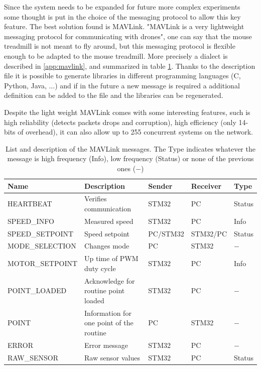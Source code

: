 \documentclass[12pt,a4paper]{article}
\begin{document}
Since the system needs to be expanded for future more complex experiments some thought is put in the choice of the messaging protocol to allow this key feature.
The best solution found is MAVLink. "MAVLink is a very lightweight messaging protocol for communicating with drones"\cite{mavlink}, one can say that the mouse treadmill is not meant to fly around, but this messaging protocol is flexible enough to be adapted to the mouse treadmill.
More precisely a dialect is described in \ref{app:mavlink}, and summarized in table \ref{tab:msg}. Thanks to the description file it is possible to generate libraries in different programming languages (C, Python, Java, ...) and if in the future a new message is required a additional definition can be added to the file and the libraries can be regenerated.

Despite the light weight MAVLink comes with some interesting features, such is high reliability (detects packets drops and corruption), high efficiency (only 14-bits of overhead), it can also allow up to 255 concurrent systems on the network.

\begin{table}[H]
	\centering
	\begin{tabular}{l||p{3cm}|l|l|l} 
		\textbf{Name} &\textbf{Description} &\textbf{Sender} &\textbf{Receiver} & \textbf{Type}\\ 
		\hline
		\hline 
		HEARTBEAT &Verifies communication& STM32 & PC & Status \\ 
		\hline 
		SPEED\_INFO &Measured speed  & STM32 & PC & Info \\ 
		\hline 
		SPEED\_SETPOINT & Speed setpoint & PC/STM32 & STM32/PC & Status\\ 
		\hline 
		MODE\_SELECTION & Changes mode & PC & STM32 & $-$\\ 
		\hline 
		MOTOR\_SETPOINT & Up time of PWM duty cycle & STM32 & PC & Info  \\ 
		\hline 
		POINT\_LOADED & Acknowledge for routine point loaded  & STM32 & PC & $-$ \\ 
		\hline 
		POINT & Information for one point of the routine  & PC & STM32 & $-$  \\  
		\hline 
		ERROR & Error message & STM32 & PC & $-$  \\
		\hline
		RAW\_SENSOR & Raw sensor values & STM32 & PC & Status\\
	\end{tabular} 
	\caption{List and description of the MAVLink messages. The Type indicates whatever the message is high frequency (Info), low frequency (Status) or none of the previous ones ($-$)}
	\label{tab:msg}
\end{table}
\end{document}
